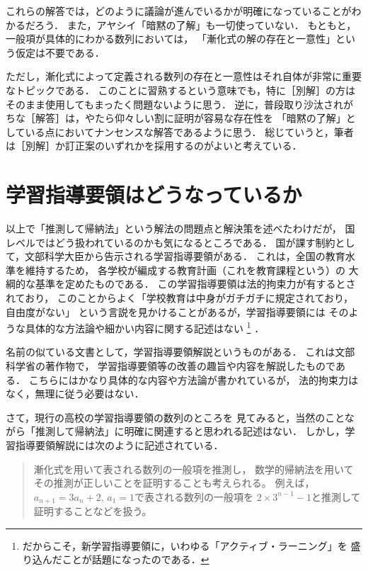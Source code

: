 \documentclass[11pt,a4paper]{ltjsarticle} %
\theoremstyle{mystyle} %
\begin{document}
これらの解答では，どのように議論が進んでいるかが明確になっていることがわかるだろう．
また，アヤシイ「暗黙の了解」も一切使っていない．
もともと，一般項が具体的にわかる数列においては，
「漸化式の解の存在と一意性」という仮定は不要である．

ただし，漸化式によって定義される数列の存在と一意性はそれ自体が非常に重要なトピックである．
このことに習熟するという意味でも，特に［別解］の方はそのまま使用してもまったく問題ないように思う．
逆に，普段取り沙汰されがちな［解答］は，やたら仰々しい割に証明が容易な存在性を
「暗黙の了解」としている点においてナンセンスな解答であるように思う．
総じていうと，筆者は［別解］か訂正案のいずれかを採用するのがよいと考えている．

\section{学習指導要領はどうなっているか}
以上で「推測して帰納法」という解法の問題点と解決策を述べたわけだが，
国レベルではどう扱われているのかも気になるところである．
国が課す制約として，文部科学大臣から告示される学習指導要領がある．
これは，全国の教育水準を維持するため，
各学校が編成する教育計画（これを教育課程という）の
大綱的な基準を定めたものである\cite{monkasyo}．
この学習指導要領は法的拘束力が有するとされており，
このことからよく「学校教育は中身がガチガチに規定されており，自由度がない」
という言説を見かけることがあるが，学習指導要領には
そのような具体的な方法論や細かい内容に関する記述はない
\footnote{
	だからこそ，新学習指導要領に，いわゆる「アクティブ・ラーニング」を
	盛り込んだことが話題になったのである．
}
．

名前の似ている文書として，学習指導要領解説というものがある．
これは文部科学省の著作物で，
学習指導要領等の改善の趣旨や内容を解説したものである\cite{monkasyo}．
こちらにはかなり具体的な内容や方法論が書かれているが，
法的拘束力はなく，無理に従う必要はない．


さて，現行の高校の学習指導要領\cite{youryou}の数列のところを
見てみると，当然のことながら「推測して帰納法」に明確に関連すると思われる記述はない．
しかし，学習指導要領解説\cite{youryoukai}には次のように記述されている．

\begin{quote}
	漸化式を用いて表される数列の一般項を推測し，
	数学的帰納法を用いてその推測が正しいことを証明することも考えられる。
	例えば，$a_{n+1} = 3 a_n + 2 , \, a_1=1$で表される数列の一般項を
	$2 \times 3^{n-1} -1 $と推測して証明することなどを扱う。
\end{quote}
\end{document}
